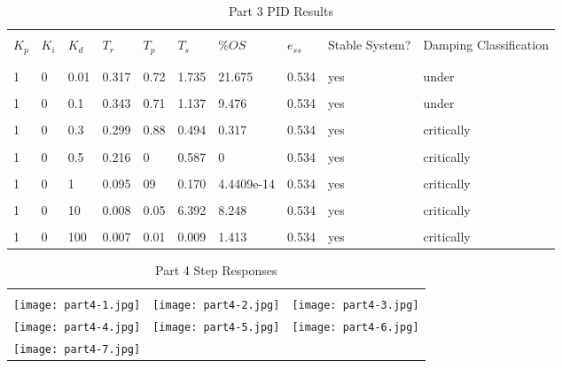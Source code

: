 \begin{table}[H]
	\begin{tabularx}{\textwidth}{XXXXXXXXXX}
		\toprule
		\\ $K_p$ & $K_i$ & $K_d$ & $T_r$ & $T_p$ & $T_s$ & $\%OS$ & $e_{ss}$ 
		& Stable System? & Damping Classification
		\\ \midrule
		
\\\midrule\\1&0&0.01&0.317&0.72&1.735&21.675&0.534&yes&under 
\\\midrule\\1&0&0.1&0.343&0.71&1.137&9.476&0.534&yes&under 
\\\midrule\\1&0&0.3&0.299&0.88&0.494&0.317&0.534&yes&critically 
\\\midrule\\1&0&0.5&0.216&0&0.587&0&0.534&yes&critically 
\\\midrule\\1&0&1&0.095&09&0.170&4.4409e-14&0.534&yes&critically 
\\\midrule\\1&0&10&0.008&0.05&6.392&8.248&0.534&yes&critically 
\\\midrule\\1&0&100&0.007&0.01&0.009&1.413&0.534&yes&critically 
		\\ \bottomrule
	\end{tabularx}
	\caption{Part 3 PID Results}
	\label{tab:pid3SimResults}
\end{table}
\begin{table}[H]
\begin{tabular}{ccc}
\toprule
\\ \texttt{[image: part4-1.jpg]} 
& \texttt{[image: part4-2.jpg]} 
& \texttt{[image: part4-3.jpg]} 
\\ \texttt{[image: part4-4.jpg]} 
& \texttt{[image: part4-5.jpg]} 
& \texttt{[image: part4-6.jpg]} 
\\ \texttt{[image: part4-7.jpg]} 
\\ \bottomrule
\end{tabular}
\caption{Part 4 Step Responses}
  \label{tab:part4Response}
\end{table}
